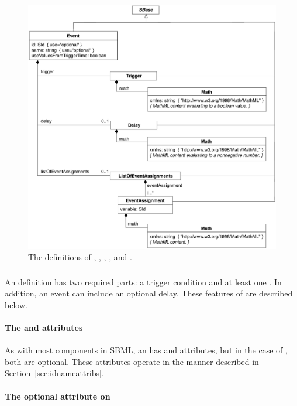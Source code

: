 \begin{figure}[htb]
  \centering
  \small
  \includegraphics[scale=0.8]{figs/event-uml}
  \caption{The definitions of \Event, \Trigger, \Delay,
    \EventAssignment, and \ListOfEventAssignments.}
  \label{fig:event}
\end{figure}


\subsubsection{}

An \Event definition has two required parts: a trigger condition
and at least one \EventAssignment.  In addition, an event can
include an optional delay.  These features of \Event are described
below.


\paragraph{The  and  attributes}
\label{sec:event-id-name}

As with most components in SBML, an \Event has  and
 attributes, but in the case of \Event, both are optional.
These attributes operate in the manner described in
Section~\ref{sec:idnameattribs}.


\paragraph{The optional  attribute on }
\label{sec:event-sboterm}

